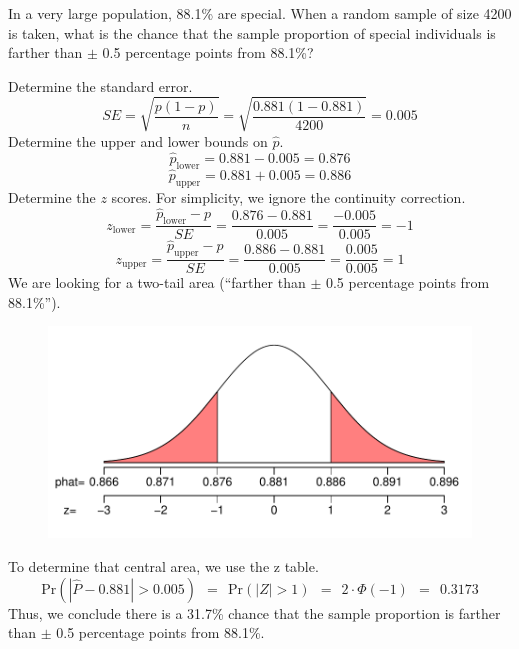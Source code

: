 
\begin{question}
In a very large population, 88.1\% are special. When a random sample of
size 4200 is taken, what is the chance that the sample proportion of
special individuals is farther than \(\pm\) 0.5 percentage points from
88.1\%?
\end{question}

\begin{solution}
Determine the standard error.
\[SE = \sqrt{\frac{p(1-p)}{n}} = \sqrt{\frac{0.881(1-0.881)}{4200}} = 0.005 \]
Determine the upper and lower bounds on \(\hat{p}\).
\[\hat{p}_{\text{lower}} = 0.881-0.005 = 0.876 \]
\[\hat{p}_{\text{upper}} = 0.881+0.005 = 0.886 \] Determine the \(z\)
scores. For simplicity, we ignore the continuity correction.
\[z_{\text{lower}} = \frac{\hat{p}_{\text{lower}}-p}{SE} = \frac{0.876-0.881}{0.005} = 
\frac{-0.005}{0.005} = -1 \]
\[z_{\text{upper}} = \frac{\hat{p}_{\text{upper}}-p}{SE} = \frac{0.886-0.881}{0.005} = \frac{0.005}{0.005} = 1 \]
We are looking for a two-tail area (``farther than \(\pm\) 0.5
percentage points from 88.1\%'').

\begin{figure}
\centering
\includegraphics{phat_sampling_outer-1.pdf}
\caption{}
\end{figure}

To determine that central area, we use the z table.
\[\text{Pr}\left(|\hat{P}-0.881| > 0.005\right) ~~=~~ \text{Pr}\left(|Z| > 1\right) ~~=~~ 2\cdot\Phi(-1) ~~=~~ 0.3173 \]
Thus, we conclude there is a 31.7\% chance that the sample proportion is
farther than \(\pm\) 0.5 percentage points from 88.1\%.
\end{solution}

